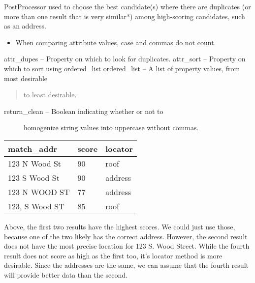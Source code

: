\documentclass[letterpaper,10pt,english]{sphinxmanual}
\begin{document}
\begin{fulllineitems}
\label{index:omgeo.processors.postprocessors.DupePicker}
PostProcessor used to choose the best candidate(s)
where there are duplicates (or more than one result
that is very similar*) among high-scoring candidates,
such as an address.
\begin{itemize}
\item {} 
When comparing attribute values, case and commas do not count.

\end{itemize}

attr\_dupes      -- Property on which to look for duplicates.
attr\_sort       -- Property on which to sort using ordered\_list
ordered\_list    -- A list of property values, from most desirable
\begin{quote}

to least desirable.
\end{quote}
\begin{description}
\item[{return\_clean    -- Boolean indicating whether or not to}] \leavevmode
homogenize string values into uppercase
without commas.

\end{description}

\begin{tabulary}{\linewidth}{|L|L|L|}
\hline

match\_addr
 & 
score
 & 
locator
\\\hline

123 N Wood St
 & 
90
 & 
roof
\\\hline

123 S Wood St
 & 
90
 & 
address
\\\hline

123 N WOOD ST
 & 
77
 & 
address
\\\hline

123, S Wood ST
 & 
85
 & 
roof
\\\hline
\end{tabulary}


Above, the first two results have the highest scores. We could just
use those, because one of the two likely has the correct address.
However, the second result does not have the most precise location
for 123 S. Wood Street. While the fourth result does not score as
high as the first too, it's locator method is more desirable.
Since the addresses are the same, we can assume that the fourth result
will provide better data than the second.


\end{fulllineitems}
\end{document}
